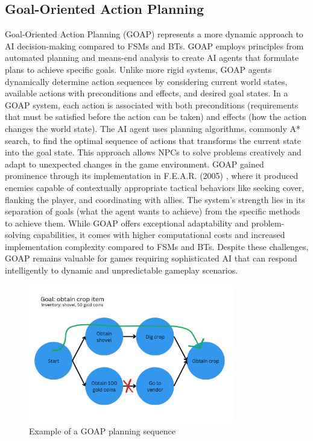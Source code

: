 \subsection{Goal-Oriented Action Planning}

Goal-Oriented Action Planning (GOAP) represents a more dynamic approach to AI decision-making compared to FSMs and BTs. 
GOAP employs principles from automated planning and means-end analysis to create AI agents that formulate plans to achieve specific goals. Unlike more rigid systems, GOAP agents dynamically determine action sequences by considering current world states, available actions with preconditions and effects, and desired goal states.
In a GOAP system, each action is associated with both preconditions (requirements that must be satisfied before the action can be taken) and effects (how the action changes the world state).
The AI agent uses planning algorithms, commonly A* search, to find the optimal sequence of actions that transforms the current state into the goal state. 
This approach allows NPCs to solve problems creatively and adapt to unexpected changes in the game environment.
GOAP gained prominence through its implementation in F.E.A.R. (2005) \cite{thompson2020fear}, where it produced enemies capable of contextually appropriate tactical behaviors like seeking cover, flanking the player, and coordinating with allies. 
The system's strength lies in its separation of goals (what the agent wants to achieve) from the specific methods to achieve them.
While GOAP offers exceptional adaptability and problem-solving capabilities, it comes with higher computational costs and increased implementation complexity compared to FSMs and BTs. Despite these challenges, GOAP remains valuable for games requiring sophisticated AI that can respond intelligently to dynamic and unpredictable gameplay scenarios.

\begin{figure}[H]
    \centering
    \includegraphics[width=0.8\textwidth]{figures/goap.png}
    \caption{Example of a GOAP planning sequence}
    \label{fig:goap}
\end{figure}

